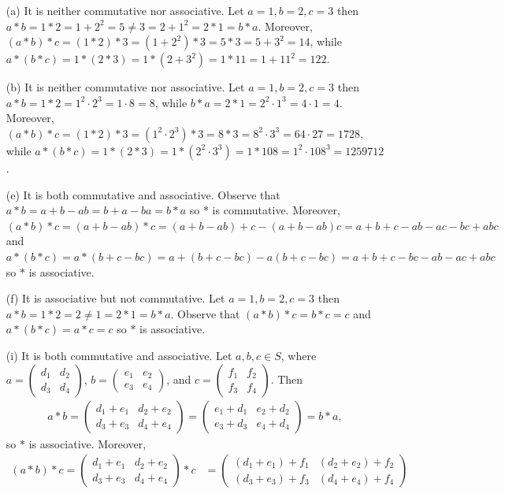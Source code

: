 \documentclass[12pt]{article}
\numberwithin{theorem}{section}
\numberwithin{equation}{section}
\numberwithin{remark}{section}
\numberwithin{definition}{section}
\numberwithin{theorem}{section}
\numberwithin{lemma}{section}
\numberwithin{example}{section}
\begin{document}
\begin{itemize}
	\item[(a)]{It is neither commutative nor associative. Let $a=1, b=2, c=3$ then $a*b=1*2=1+2^2=5\neq3=2+1^2=2*1=b*a$. Moreover, $(a*b)*c=(1*2)*3=(1+2^2)*3=5*3=5+3^2=14$, while $a*(b*c)=1*(2*3)=1*(2+3^2)=1*11=1+11^2=122$.}
	\item[(b)]{It is neither commutative nor associative. Let $a=1, b=2, c=3$ then $a*b=1*2=1^2\cdot2^3=1\cdot8=8$, while $b*a=2*1=2^2\cdot1^3=4\cdot1=4$. Moreover, $(a*b)*c=(1*2)*3=(1^2\cdot2^3)*3=8*3=8^2\cdot3^3=64\cdot27=1728$, while $a*(b*c)=1*(2*3)=1*(2^2\cdot3^3)=1*108=1^2\cdot108^3=1259712$.}
	\item[(e)]{It is both commutative and associative. Observe that $a*b=a+b-ab=b+a-ba=b*a$ so $*$ is commutative. Moreover, $(a*b)*c=(a+b-ab)*c=(a+b-ab)+c-(a+b-ab)c=a+b+c-ab-ac-bc+abc$ and $a*(b*c)=a*(b+c-bc)=a+(b+c-bc)-a(b+c-bc)=a+b+c-bc-ab-ac+abc$ so $*$ is associative.}
	\item[(f)]{It is associative but not commutative. Let $a=1, b=2, c=3$ then $a*b=1*2=2\neq 1 = 2*1=b*a$. Observe that $(a*b)*c=b*c=c$ and $a*(b*c)=a*c=c$ so $*$ is associative.}
	\item[(i)]{It is both commutative and associative. Let $a,b,c\in S$, where $a=\begin{pmatrix} d_1 & d_2 \\ d_3 & d_4 \end{pmatrix}$, $b=\begin{pmatrix} e_1 & e_2 \\ e_3 & e_4 \end{pmatrix}$, and $c=\begin{pmatrix} f_1 & f_2 \\ f_3 & f_4 \end{pmatrix}$. Then
		\begin{align*}
			a*b=\begin{pmatrix} d_1+e_1 & d_2+e_2 \\ d_3+e_3 & d_4+e_4 \end{pmatrix}=\begin{pmatrix} e_1+d_1 & e_2+d_2 \\ e_3+d_3 & e_4+d_4 \end{pmatrix}=b*a,
		\end{align*}
	so $*$ is associative. Moreover,
		\begin{align*}
			(a*b)*c=\begin{pmatrix} d_1+e_1 & d_2+e_2 \\ d_3+e_3 & d_4+e_4 \end{pmatrix}*c&=\begin{pmatrix} (d_1+e_1)+f_1 & (d_2+e_2)+f_2 \\ (d_3+e_3)+f_3 & (d_4+e_4)+f_4 \end{pmatrix}\\

\end{align*}}
\end{itemize}
\end{document}
